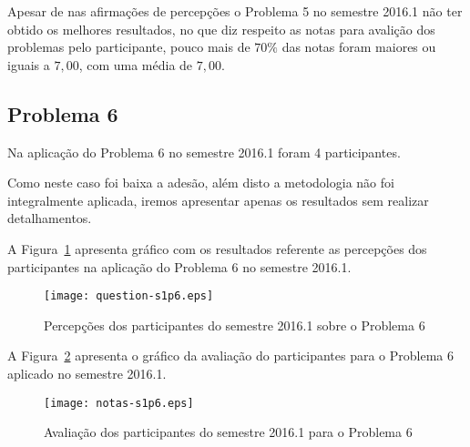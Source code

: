 Apesar de nas afirmações de percepções o Problema 5 no semestre
2016.1 não ter obtido os melhores resultados, no que diz respeito
as notas para avalição dos problemas pelo participante,
pouco mais de $70\%$ das notas foram maiores ou iguais a $7,00$, com
uma média de $7,00$.

\subsection{Problema 6}
Na aplicação do Problema 6 no semestre 2016.1 foram 4 participantes.

Como neste caso foi baixa a adesão, além disto a metodologia
não foi integralmente aplicada, iremos apresentar apenas
os resultados sem realizar detalhamentos.

A Figura~\ref{percep-s1p6} apresenta gráfico com os resultados referente
as percepções dos participantes na aplicação do
Problema 6 no semestre 2016.1.

\begin{figure}[!htb]
\centering
\texttt{[image: question-s1p6.eps]}
\caption{Percepções dos participantes do semestre 2016.1 sobre o Problema 6}
\label{percep-s1p6}
\end{figure}

A Figura~\ref{aval-s1p6} apresenta o gráfico da
avaliação do participantes para o Problema 6 aplicado no semestre 2016.1.

\begin{figure}[!htb]
\centering
\texttt{[image: notas-s1p6.eps]}
\caption{Avaliação dos participantes do semestre 2016.1 para o Problema 6}
\label{aval-s1p6}
\end{figure}
